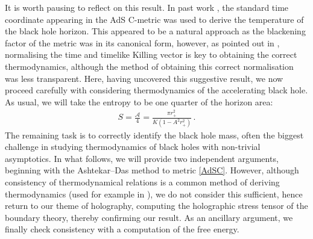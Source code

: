 \documentclass[
twoside,
openright,
frontopenright
]{dmathesis}
\newcommand{\tcr}{\textcolor{red}}
\begin{document}
It is worth pausing to reflect on this result. In past work
\cite{Appels:2016uha,Appels:2017xoe,Gregory:2017ogk},
the standard time coordinate appearing in the AdS C-metric was used to derive
the temperature of the black hole horizon.
This appeared to
be a natural approach as the blackening factor of the metric was in its
canonical form, however, as pointed out in \cite{Gibbons:2004ai}, normalising the
time and timelike Killing vector is key to obtaining the correct
thermodynamics, although the method of obtaining this correct
normalisation was less transparent. Here, having uncovered this
suggestive result, we now proceed carefully with considering
thermodynamics of the accelerating black hole.
As usual, we will take the entropy to be one quarter of the horizon area:
\begin{align}
S=\frac{\mathcal{A}}{4}=\frac{\pi r_+^2}{K(1-A^2r_+^2)}\,.
\label{entropy}
\end{align}
The remaining task is to correctly identify the black hole mass, often the
biggest challenge in studying thermodynamics of black holes with non-trivial
asymptotics. In what follows, we will provide two independent arguments, %
beginning with the {Ashtekar--Das} method \cite{Ashtekar:1999jx,Das:2000cu} to metric
\eqref{AdSC}. However, although consistency
of thermodynamical relations is a common method of deriving
thermodynamics (used for {example in \cite{Astorino:2016ybm}}), we do not
consider this sufficient, hence return to our theme of holography,
computing the holographic stress tensor of the boundary
theory, thereby confirming our result.
As an ancillary argument, we finally check consistency with
a computation of the free energy.
\end{document}
